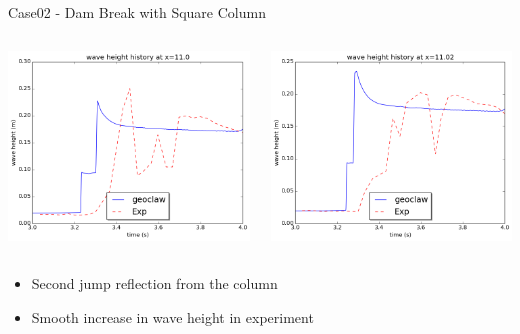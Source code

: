 \documentclass[xcolor=dvipsnames]{beamer}
\begin{document}
\begin{frame}[label=sec-5-3]{Case02 - Dam Break with Square Column}
\begin{columns}
\begin{column}{0.5\textwidth}
\begin{block}{}
\includegraphics[width=.9\linewidth]{../paper/plots/waveheight_square_x11.png} \\
\end{block}
\end{column}

\begin{column}{0.5\textwidth}
\begin{block}{}
\includegraphics[width=.9\linewidth]{../paper/plots/waveheight_square_x1102.png}  \\
\end{block}
\end{column}
\end{columns}

\begin{block}{}
\begin{itemize}
\item Second jump reflection from the column
\item Smooth increase in wave height in experiment
\end{itemize}
\end{block}
\end{frame}
\end{document}
